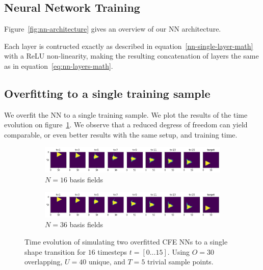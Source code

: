\subsection{Neural Network Training}\label{section:nn-training}

Figure~\ref{fig:nn-architecture} gives an overview of our \ac{NN} architecture.

Each layer is contructed exactly as described in
equation~\eqref{nn-single-layer-math} with a ReLU non-linearity, making the
resulting concatenation of layers the same as in
equation~\eqref{eq:nn-layers-math}.



\subsection*{Overfitting to a single training sample}
We overfit the \ac{NN} to a single training sample. We plot the results of
the time evolution on figure~\ref{fig:NN-overfit}. We observe that a reduced
degress of freedom can yield comparable, or even better results with the same
setup, and training time. 

\begin{figure}
  \centering
  \begin{subfigure}{\textwidth}
    \centering
    \includegraphics[width=\textwidth]{figures/nn-training/NN_N16_triangle_overfit_horizontal.png}
    \caption{$N=16$ basis fields}
  \end{subfigure}
  \begin{subfigure}{\textwidth}
    \centering
    \includegraphics[width=\textwidth]{figures/nn-training/NN_N36_triangle_overfit_horizontal.png}
    \caption{$N=36$ basis fields}
  \end{subfigure}
  \caption{Time evolution of simulating two overfitted \ac{CFE} \acp{NN} to
  a single shape transition for $16$ timesteps $t=[0\dots15]$. Using $O=30$
overlapping, $U=40$ unique, and $T=5$  trivial sample points.}
  \label{fig:NN-overfit}
\end{figure}

